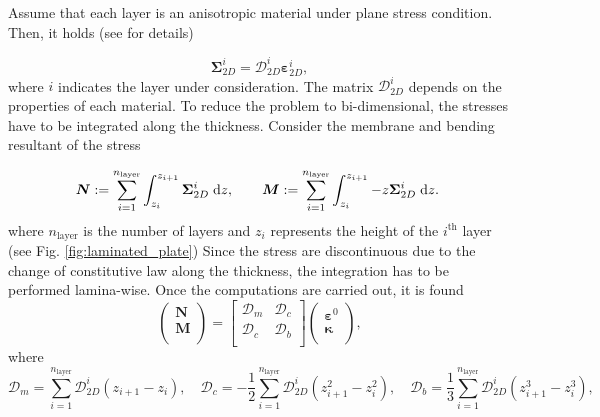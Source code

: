Assume that each layer is an anisotropic material under plane stress condition. Then, it holds (see \cite[Chapter 1]{reddy2003mechanics} for details)

\begin{equation*}
\bm{\Sigma}_{2D}^i = \bm{\mathcal{D}}_{2D}^i \bm{\varepsilon}_{2D}^i,
\end{equation*}  
where $i$ indicates the layer under consideration. The matrix $ \bm{\mathcal{D}}_{2D}^i$ depends on the properties of each material. To reduce the problem to bi-dimensional,  the stresses have to be integrated along the thickness. Consider the membrane and bending resultant of the stress 

\begin{equation}
	\begin{aligned}
	\bm{N} := \sum_{i=1}^{n_{\text{layer}}}\int_{z_i}^{z_{i+1}} \bm{\Sigma}_{2D}^i \d{z}, \qquad 
	\bm{M} := \sum_{i=1}^{n_{\text{layer}}}\int_{z_i}^{z_{i+1}} - z \bm{\Sigma}_{2D}^i \d{z}. \
	\end{aligned}
\end{equation}
where $n_{\text{layer}}$ is the number of layers and $z_i$ represents the height of the $i^{\text{th}}$ layer (see Fig. \ref{fig:laminated_plate})
Since the stress are discontinuous due to the change of constitutive law along the thickness, the integration has to be performed lamina-wise. Once the computations are carried out, it is found
\begin{equation}\label{eq:NM_laminated}
\begin{pmatrix}
\bm{N} \\ \bm{M} \\ 
\end{pmatrix} = 
\begin{bmatrix}
\bm{\mathcal{D}}_{m} & \bm{\mathcal{D}}_{c} \\
\bm{\mathcal{D}}_{c} & \bm{\mathcal{D}}_{b} \\
\end{bmatrix}
\begin{pmatrix}
\bm{\varepsilon}^0 \\ \bm{\kappa} \\ 
\end{pmatrix},
\end{equation}
where
\begin{equation}
	\bm{\mathcal{D}}_{m} = \sum_{i = 1}^{n_{\text{layer}}} \bm{\mathcal{D}}_{2D}^i (z_{i+1}-z_{i}), \quad \bm{\mathcal{D}}_{c} = -\frac{1}{2}\sum_{i = 1}^{n_{\text{layer}}} \bm{\mathcal{D}}_{2D}^i (z_{i+1}^2-z_{i}^2), \quad \bm{\mathcal{D}}_{b} = \frac{1}{3} \sum_{i = 1}^{n_{\text{layer}}} \bm{\mathcal{D}}_{2D}^i (z_{i+1}^3-z_{i}^3),
\end{equation}
